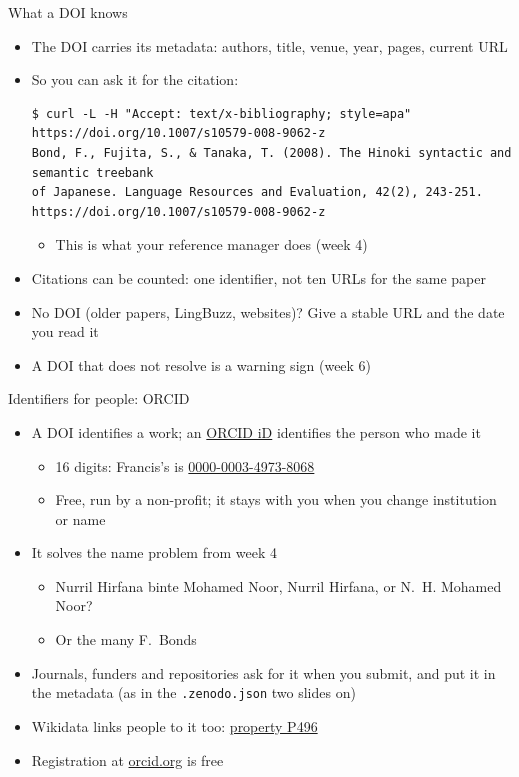 \documentclass[aspectratio=169]{beamer}
\begin{document}
\begin{frame}[fragile]{What a DOI knows}
\begin{itemize}
  \item The DOI carries its metadata: authors, title, venue, year, pages, current URL
  \item So you can ask it for the citation:
\begin{Verbatim}[fontsize=\scriptsize,breaklines]
$ curl -L -H "Accept: text/x-bibliography; style=apa" https://doi.org/10.1007/s10579-008-9062-z
Bond, F., Fujita, S., & Tanaka, T. (2008). The Hinoki syntactic and semantic treebank
of Japanese. Language Resources and Evaluation, 42(2), 243-251.
https://doi.org/10.1007/s10579-008-9062-z
\end{Verbatim}
    \begin{itemize}
    \item This is what your reference manager does (week 4)
    \end{itemize}
  \item Citations can be counted: one identifier, not ten URLs for the same paper
  \item No DOI (older papers, LingBuzz, websites)? Give a stable URL and the date you read it
  \item A DOI that does not resolve is a warning sign (week 6)
\end{itemize}
\end{frame}

\begin{frame}{Identifiers for people: ORCID}
\begin{itemize}
  \item A DOI identifies a work; an \href{https://orcid.org/}{ORCID iD}
    identifies the person who made it
    \begin{itemize}
    \item 16 digits: Francis's is \href{https://orcid.org/0000-0003-4973-8068}{0000-0003-4973-8068}
    \item Free, run by a non-profit; it stays with you when you change
      institution or name
    \end{itemize}
  \item It solves the name problem from week 4
    \begin{itemize}
    \item Nurril Hirfana binte Mohamed Noor, Nurril Hirfana, or N.~H. Mohamed Noor?
    \item Or the many F.~Bonds
    \end{itemize}
  \item Journals, funders and repositories ask for it when you submit,
    and put it in the metadata (as in the \texttt{.zenodo.json} two slides on)
  \item Wikidata links people to it too:
    \href{https://www.wikidata.org/wiki/Property:P496}{property P496}
  \item Registration at \href{https://orcid.org/}{orcid.org} is free
\end{itemize}
\end{frame}
\end{document}
